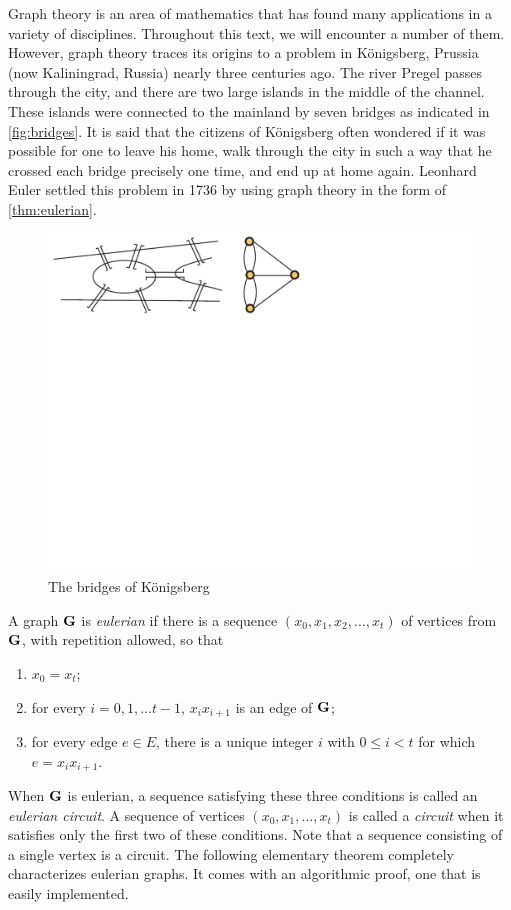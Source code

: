 Graph theory is an area of mathematics that has found many
applications in a variety of disciplines. Throughout this text, we
will encounter a number of them. However, graph theory traces its
origins to a problem in K\"onigsberg, Prussia (now Kaliningrad,
Russia) nearly three centuries ago. The river Pregel passes through
the city, and there are two large islands in the middle of the
channel. These islands were connected to the mainland by seven bridges
as indicated in \autoref{fig:bridges}. It is said that the citizens of
K\"onigsberg often wondered if it was possible for one to leave his
home, walk through the city in such a way that he crossed each bridge
precisely one time, and end up at home again. Leonhard Euler settled
this problem in 1736 by using graph theory in the form of
\autoref{thm:eulerian}.

\begin{figure}
  \centering
  \includegraphics[clip,viewport=0 306 200 400]{graphs-figs/konigsberg}
  \caption{\label{fig:bridges}The bridges of K\"onigsberg}
\end{figure}

A graph $\mathbf{G}$ is \textit{eulerian} if there is a sequence
$(x_0,x_1,x_2,\dots,x_t)$ of vertices from $\mathbf{G}$, with repetition
allowed, so that
\begin{enumerate}
\label{def:eulerian-circuit}
\item $x_0=x_t$;
\item for every $i=0,1,\dots t-1$, $x_ix_{i+1}$ is an edge of $\mathbf{G}$;
\item for every edge $e\in E$, there is a unique
  integer $i$ with $0\le i<t$ for which $e=x_ix_{i+1}$.
\end{enumerate}
When $\mathbf{G}$ is eulerian, a sequence satisfying these three conditions
is called an \textit{eulerian circuit}. A sequence of vertices
$(x_0,x_1,\dots,x_t)$ is called a \textit{circuit} when it satisfies
only the first two of these conditions.  Note that a sequence
consisting of a single vertex is a circuit. The following elementary
theorem completely characterizes eulerian graphs.  It comes with an
algorithmic proof, one that is easily implemented.

